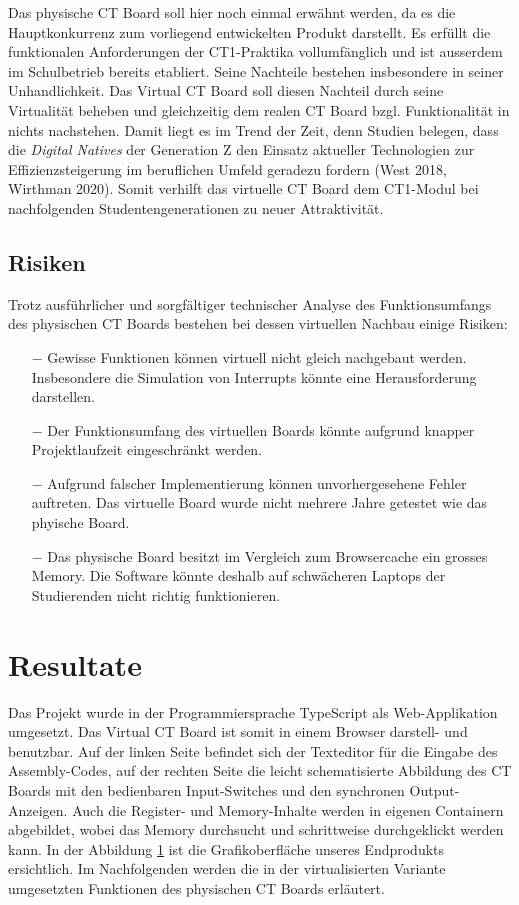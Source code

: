 \documentclass[10pt]{article}
\begin{document}
Das physische CT Board soll hier noch einmal erwähnt werden, da es die Hauptkonkurrenz zum vorliegend entwickelten Produkt darstellt. Es erfüllt die funktionalen Anforderungen der CT1-Praktika vollumfänglich und ist ausserdem im Schulbetrieb bereits etabliert. Seine Nachteile bestehen insbesondere in seiner Unhandlichkeit. Das \glqq Virtual CT Board\grqq{} soll diesen Nachteil durch seine Virtualität beheben und gleichzeitig dem realen CT Board bzgl. Funktionalität in nichts nachstehen. Damit liegt es im Trend der Zeit, denn Studien belegen, dass die \emph{Digital Natives} der Generation Z den Einsatz aktueller Technologien zur Effizienzsteigerung im beruflichen Umfeld geradezu fordern (West 2018, Wirthman 2020). Somit verhilft das virtuelle CT Board dem CT1-Modul bei nachfolgenden Studentengenerationen zu neuer Attraktivität.


\subsection{Risiken}
Trotz ausführlicher und sorgfältiger technischer Analyse des Funktionsumfangs des physischen CT Boards bestehen bei dessen virtuellen Nachbau einige Risiken:
\begin{itemize}
\item[$-$] Gewisse Funktionen können virtuell nicht gleich nachgebaut werden. Insbesondere die Simulation von Interrupts könnte eine Herausforderung darstellen.
\item[$-$] Der Funktionsumfang des virtuellen Boards könnte aufgrund knapper Projektlaufzeit eingeschränkt werden. 
\item[$-$] Aufgrund falscher Implementierung können unvorhergesehene Fehler auftreten. Das virtuelle Board wurde nicht mehrere Jahre getestet wie das phyische Board.
\item[$-$] Das physische Board besitzt im Vergleich zum Browsercache ein grosses Memory. Die Software könnte deshalb auf schwächeren Laptops der Studierenden nicht richtig funktionieren. 
\end{itemize}

\section{Resultate}

Das Projekt wurde in der Programmiersprache TypeScript als Web-Applikation umgesetzt. Das \glqq Virtual CT Board\grqq{} ist somit in einem Browser darstell- und benutzbar. Auf der linken Seite befindet sich der Texteditor für die Eingabe des Assembly-Codes, auf der rechten Seite die leicht schematisierte Abbildung des CT Boards mit den bedienbaren Input-Switches und den synchronen Output-Anzeigen. Auch die Register- und Memory-Inhalte werden in eigenen Containern abgebildet, wobei das Memory durchsucht und schrittweise durchgeklickt werden kann. In der Abbildung \ref{} ist die Grafikoberfläche unseres Endprodukts ersichtlich. Im Nachfolgenden werden die in der virtualisierten Variante umgesetzten Funktionen des physischen CT Boards erläutert.
\end{document}
